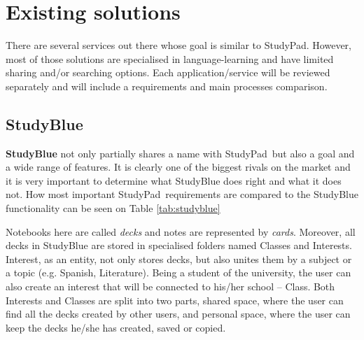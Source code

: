 \documentclass[thesis=B,english]{FITthesis}[2012/10/20]
\newcommand{\appname}{StudyPad}
\begin{document}
\newpage

\section{Existing solutions}

There are several services out there whose goal is similar to \appname. However, most of those solutions are specialised in language-learning and have limited sharing and/or searching options. Each application/service will be reviewed separately and will include a requirements and main processes comparison.

\subsection{StudyBlue}

\textbf{StudyBlue} not only partially shares a name with \appname\ but also a goal and a wide range of features. It is clearly one of the biggest rivals on the market and it is very important to determine what StudyBlue does right and what it does not. How most important \appname\ requirements are compared to the StudyBlue functionality can be seen on Table \ref{tab:studyblue}

Notebooks here are called \textit{decks} and notes are represented by \textit{cards}. Moreover, all decks in StudyBlue are stored in specialised folders named Classes and Interests. Interest, as an entity, not only stores decks, but also unites them by a subject or a topic (e.g. Spanish, Literature). Being a student of the university, the user can also create an interest that will be connected to his/her school -- Class. Both Interests and Classes are split into two parts, shared space, where the user can find all the decks created by other users, and personal space, where the user can keep the decks he/she has created, saved or copied.
\end{document}
